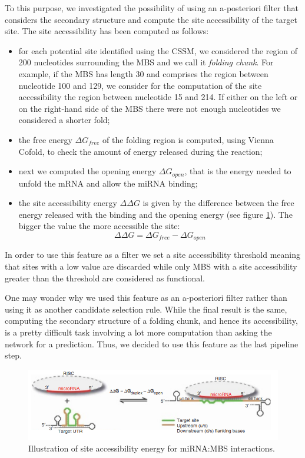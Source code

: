 To this purpose, we investigated the possibility of using an a-posteriori filter that considers the secondary structure and compute the site accessibility of the target site. The site accessibility has been computed as follows:
\begin{itemize}
	\item for each potential site identified using the CSSM, we considered the region of 200 nucleotides surrounding the MBS and we call it \emph{folding chunk}. For example, if the MBS has length 30 and comprises the region between nucleotide 100 and 129, we consider for the computation of the site accessibility the region between nucleotide 15 and 214. If either on the left or on the right-hand side of the MBS there were not enough nucleotides we considered a shorter fold;
	\item the free energy $\Delta G_{free}$ of the folding region is computed, using Vienna Cofold, to check the amount of energy released during the reaction;
	\item next we computed the opening energy $\Delta G_{open}$, that is the energy needed to unfold the mRNA and allow the miRNA binding;
	\item the site accessibility energy $\Delta\Delta G$ is given by the difference between the free energy released with the binding and the opening energy (see figure \ref{fig:site_accessibility}). The bigger the value the more accessible the site:
	\begin{equation} \label{eq:sa}
		\Delta\Delta G = \Delta G_{free} - \Delta G_{open}
	\end{equation}
	 
\end{itemize}    

In order to use this feature as a filter we set a site accessibility threshold meaning that sites with a low value are discarded while only MBS with a site accessibility greater than the threshold are considered as functional. 

One may wonder why we used this feature as an a-posteriori filter rather than using it as another candidate selection rule. While the final result is the same, computing the secondary structure of a folding chunk, and hence its accessibility, is a pretty difficult task involving a lot more computation than asking the network for a prediction. Thus, we decided to use this feature as the last pipeline step.

\begin{figure}[hbt!]
	\centering
	\includegraphics[width=1\textwidth]{Figures/site_accessibility}
	\caption{Illustration of site accessibility energy for miRNA:MBS interactions.}
	\label{fig:site_accessibility}
\end{figure}

